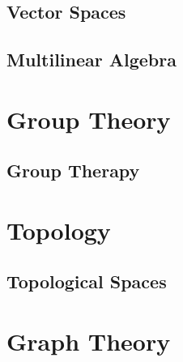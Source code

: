 \chapter{Vector Spaces}










\chapter{Multilinear Algebra}







\part{Group Theory}

\chapter{Group Therapy}






\part{Topology}

\chapter{Topological Spaces}












\part{Graph Theory}


